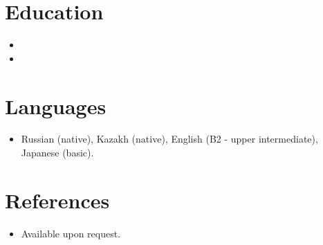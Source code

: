 \documentclass[11pt,a4paper,sans]{moderncv}
\begin{document}

\section{Education}
\vspace{1pt}
\begin{itemize}

\item{}

\vspace{3pt}

\item{}

\end{itemize}


\section{Languages}
\vspace{1pt}
\begin{itemize}
\item Russian (native), Kazakh (native), English (B2 - upper intermediate), Japanese (basic).
\end{itemize}



\section{References}
\vspace{1pt}
\begin{itemize}
\item{Available upon request.}
\end{itemize}
\end{document}
